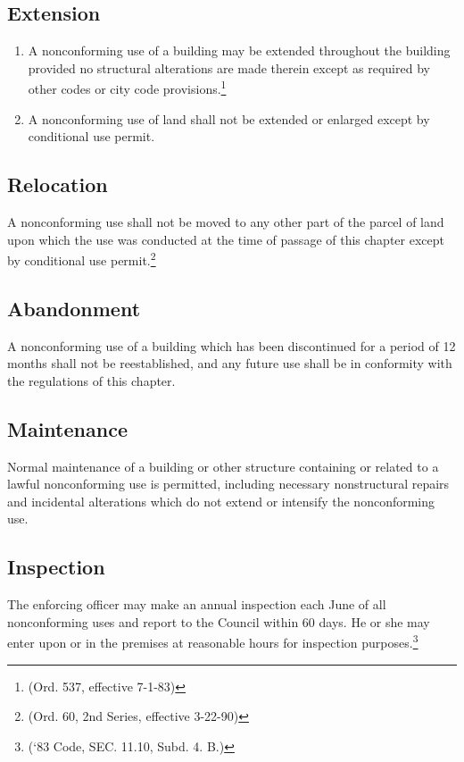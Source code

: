 \subsection{Extension}
\begin{enumerate}[{\indent}1)]
    \item A nonconforming use of a building may be extended throughout the building provided no structural alterations are made therein except as required by other codes or city code provisions.\footnote{(Ord. 537, effective 7-1-83)}
    \item A nonconforming use of land shall not be extended or enlarged except by conditional use permit.
\end{enumerate}
\subsection{Relocation}
A nonconforming use shall not be moved to any other part of the parcel of land upon which the use was conducted at the time of passage of this chapter except by conditional use permit.\footnote{(Ord. 60, 2nd Series, effective 3-22-90)}
\subsection{Abandonment}
A nonconforming use of a building which has been discontinued for a period of 12 months shall not be reestablished, and any future use shall be in conformity with the regulations of this chapter.
\subsection{Maintenance}
Normal maintenance of a building or other structure containing or related to a lawful nonconforming use is permitted, including necessary nonstructural repairs and incidental alterations which do not extend or intensify the nonconforming use.
\subsection{Inspection}
The enforcing officer may make an annual inspection each June of all nonconforming uses and report to the Council within 60 days.  He or she may enter upon or in the premises at reasonable hours for inspection purposes.\footnote{(‘83 Code, SEC. 11.10, Subd. 4. B.)}


\setcounter{section}{129}
